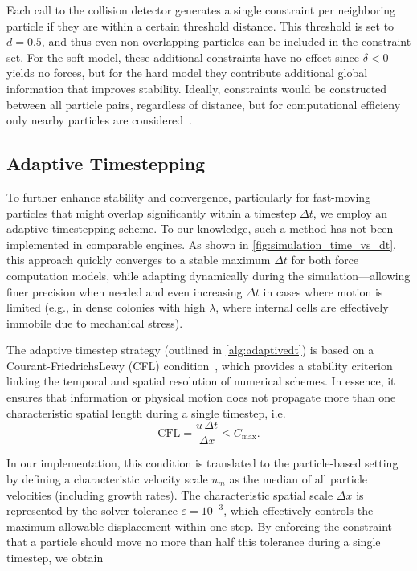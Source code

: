 \documentclass[conference]{IEEEtran}
\begin{document}
Each call to the collision detector generates a single constraint per neighboring particle if they are within a certain threshold distance. This threshold is set to $d=0.5$, and thus even non-overlapping particles can be included in the constraint set. For the soft model, these additional constraints have no effect since $\delta < 0$ yields no forces, but for the hard model they contribute additional global information that improves stability. Ideally, constraints would be constructed between all particle pairs, regardless of distance, but for computational efficieny only nearby particles are considered~\cite{Yan2019, Yan2022}.


\subsection{Adaptive Timestepping}

To further enhance stability and convergence, particularly for fast-moving particles that might overlap significantly within a timestep $\Delta t$, we employ an adaptive timestepping scheme. To our knowledge, such a method has not been implemented in comparable engines. As shown in \autoref{fig:simulation_time_vs_dt}, this approach quickly converges to a stable maximum $\Delta t$ for both force computation models, while adapting dynamically during the simulation—allowing finer precision when needed and even increasing $\Delta t$ in cases where motion is limited (e.g., in dense colonies with high $\lambda$, where internal cells are effectively immobile due to mechanical stress).


The adaptive timestep strategy (outlined in \autoref{alg:adaptivedt}) is based on a Courant-FriedrichsLewy (CFL) condition~\cite{Courant1928}, which provides a stability criterion linking the temporal and spatial resolution of numerical schemes. In essence, it ensures that information or physical motion does not propagate more than one characteristic spatial length during a single timestep, i.e.
\begin{equation}
    \text{CFL} = \frac{u \, \Delta t}{\Delta x} \leq C_{\text{max}}.
\end{equation}

In our implementation, this condition is translated to the particle-based setting by defining a characteristic velocity scale $u_m$ as the median of all particle velocities (including growth rates).
The characteristic spatial scale $\Delta x$ is represented by the solver tolerance $\varepsilon = 10^{-3}$, which effectively controls the maximum allowable displacement within one step.
By enforcing the constraint that a particle should move no more than half this tolerance during a single timestep, we obtain
\end{document}
